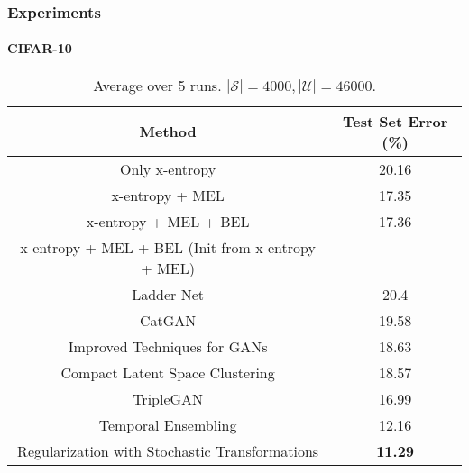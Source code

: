 \begin{frame}
	\frametitle{Experiments}
	\framesubtitle{CIFAR-10}
	\begin{table}
		\centering
		\resizebox{\textwidth}{!}
		{
		\begin{tabular}{|c|c|}
			\hline
			\textbf{Method} & Test Set Error (\%)\\
			\hline
			Only x-entropy & 20.16\\
			x-entropy + MEL & 17.35\\
			x-entropy + MEL + BEL & 17.36\\
			x-entropy + MEL + BEL (Init from x-entropy + MEL) & \\
			\hline
			\hline
			Ladder Net & 20.4\\
			CatGAN & 19.58\\
			Improved Techniques for GANs & 18.63\\
			Compact Latent Space Clustering & 18.57\\
			TripleGAN & 16.99\\
			Temporal Ensembling & 12.16\\
			Regularization with Stochastic Transformations & \textbf{11.29}\\
			\hline
		\end{tabular}
		}
		\caption{\tiny{Average over 5 runs. $|\mathcal{S}| = 4000, |\mathcal{U}| = 46000$.}}
	\end{table}
\end{frame}

